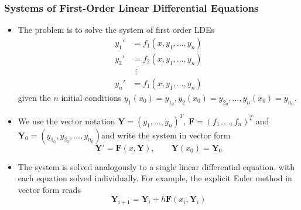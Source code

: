 \documentclass[11pt, a4paper]{article}
\begin{document}
\subsubsection{Systems of First-Order Linear Differential Equations}
\begin{itemize}
	\item The problem is to solve the system of first order LDEs
	\begin{align*}
		y_{1}' &= f_{1}(x, y_{1}, \ldots, y_{n}) \\
		y_{2}' &= f_{2}(x, y_{1}, \ldots, y_{n})\\[-3mm]
		& \ \, \vdots\\[-2.5mm]
		y_{n}' &= f_{1}(x, y_{1}, \ldots, y_{n})
	\end{align*}
	given the $ n $ initial conditions $ y_{1}(x_{0}) = y_{1_{0}}, y_{2}(x_{0}) = y_{2_{0}}, \ldots, y_{n}(x_{0}) = y_{n_{0}} $.
	
	\item We use the vector notation $ \bm{Y} = (y_{1}, \ldots, y_{n})^{T} $, $ \bm{F} = (f_{1}, \ldots, f_{n})^{T} $ and $ \bm{Y}_{0} = ( y_{1_{0}}, y_{2_{0}}, \ldots, y_{n_{0}}) $and write the system in vector form
	\begin{equation*}
		\bm{Y}' = \bm{F}(x, \bm{Y}), \qquad \bm{Y}(x_{0}) = \bm{Y}_{0}
	\end{equation*}
	
	\item The system is solved analogously to a single linear differential equation, with each equation solved individually. For example, the explicit Euler method in vector form reads
	\begin{equation*}
		\bm{Y}_{i+1} = \bm{Y}_{i} + h \bm{F}(x_{i}, \bm{Y}_{i})
	\end{equation*}
	
\end{itemize}
\end{document}
